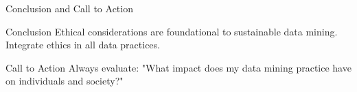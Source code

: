 \documentclass[aspectratio=169]{beamer}
\begin{document}
\begin{frame}[fragile]{Conclusion and Call to Action}
  \begin{block}{Conclusion}
    Ethical considerations are foundational to sustainable data mining. Integrate ethics in all data practices.
  \end{block}

  \begin{block}{Call to Action}
    Always evaluate: "What impact does my data mining practice have on individuals and society?"
  \end{block}
\end{frame}
\end{document}
